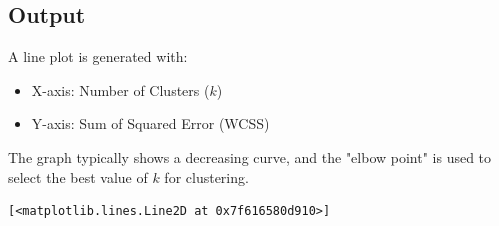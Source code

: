 \documentclass[11pt]{article}
\makeatletter
\newcommand{\boxspacing}{\kern\kvtcb@left@rule\kern\kvtcb@boxsep}
\newcommand{\prompt}[4]{
        {\ttfamily\llap{{\color{#2}[#3]:\hspace{3pt}#4}}\vspace{-\baselineskip}}
    }
\makeatother
\begin{document}
\subsection*{Output}
A line plot is generated with:
\begin{itemize}
    \item X-axis: Number of Clusters ($k$)
    \item Y-axis: Sum of Squared Error (WCSS)
\end{itemize}

The graph typically shows a decreasing curve, and the "elbow point" is used to select the best value of $k$ for clustering.
\begin{tcolorbox}[breakable, size=fbox, boxrule=.5pt, pad at break*=1mm, opacityfill=0]
\prompt{Out}{outcolor}{32}{\boxspacing}
\begin{Verbatim}[commandchars=\\\{\}]
[<matplotlib.lines.Line2D at 0x7f616580d910>]
\end{Verbatim}
\end{tcolorbox}
        
    \begin{center}
    \end{center}
    { \hspace*{\fill} \\}
    

    
    
    
\end{document}
